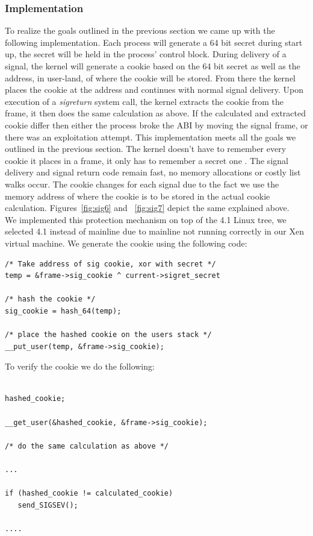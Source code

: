 \documentclass{sig-alternate-05-2015}
\begin{document}
\subsubsection{Implementation}
To realize the goals outlined in the previous section we came up with the following implementation. Each process will generate a 64 bit secret during start up, the secret will be held in the process' control block. During delivery of a signal, the kernel will generate a cookie based on the 64 bit secret as well as the address, in user-land, of where the cookie will be stored. From there the kernel places the cookie at the address and continues with normal signal delivery. Upon execution of a \textit{sigreturn} system call, the kernel extracts the cookie from the frame, it then does the same calculation as above. If the calculated and extracted cookie differ then either the process broke the ABI by moving the signal frame, or there was an exploitation attempt. This implementation meets all the goals we outlined in the previous section. The kernel doesn't have to remember every cookie it places in a frame, it only has to remember a secret one . The signal delivery and signal return code remain fast, no memory allocations or costly list walks occur. The cookie changes for each signal due to the fact we use the memory address of where the cookie is to be stored in the actual cookie calculation. Figures~\ref{fig:sig6} and ~\ref{fig:sig7} depict the same explained above.
\\
\indent
We implemented this protection mechanism on top of the 4.1 Linux tree, we selected 4.1 instead of mainline due to mainline not running correctly in our Xen virtual machine. We generate the cookie using the following code:
\\
\begin{verbatim}
/* Take address of sig cookie, xor with secret */
temp = &frame->sig_cookie ^ current->sigret_secret

/* hash the cookie */
sig_cookie = hash_64(temp);

/* place the hashed cookie on the users stack */
__put_user(temp, &frame->sig_cookie);

\end{verbatim}

To verify the cookie we do the following:

\begin{verbatim}

hashed_cookie;

__get_user(&hashed_cookie, &frame->sig_cookie);

/* do the same calculation as above */

...

if (hashed_cookie != calculated_cookie)
   send_SIGSEV();

....

\end{verbatim}
\end{document}
